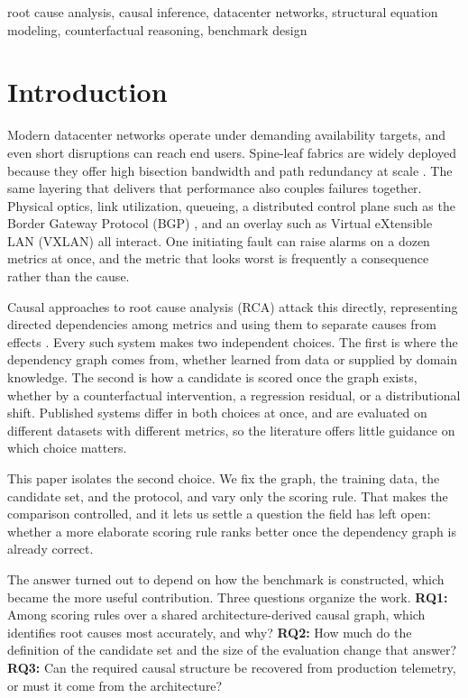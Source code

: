 \documentclass[conference]{IEEEtran}
\begin{document}
\begin{IEEEkeywords}
root cause analysis, causal inference, datacenter networks, structural equation modeling, counterfactual reasoning, benchmark design
\end{IEEEkeywords}

\section{Introduction}
Modern datacenter networks operate under demanding availability targets, and even short disruptions can reach end users. Spine-leaf fabrics are widely deployed because they offer high bisection bandwidth and path redundancy at scale \cite{alfares2008fattree,greenberg2009vl2}. The same layering that delivers that performance also couples failures together. Physical optics, link utilization, queueing, a distributed control plane such as the Border Gateway Protocol (BGP) \cite{rekhter2006bgp}, and an overlay such as Virtual eXtensible LAN (VXLAN) \cite{mahalingam2014vxlan} all interact. One initiating fault can raise alarms on a dozen metrics at once, and the metric that looks worst is frequently a consequence rather than the cause.

Causal approaches to root cause analysis (RCA) attack this directly, representing directed dependencies among metrics and using them to separate causes from effects \cite{pearl2009causality,peters2017elements}. Every such system makes two independent choices. The first is where the dependency graph comes from, whether learned from data or supplied by domain knowledge. The second is how a candidate is scored once the graph exists, whether by a counterfactual intervention, a regression residual, or a distributional shift. Published systems differ in both choices at once, and are evaluated on different datasets with different metrics, so the literature offers little guidance on which choice matters.

This paper isolates the second choice. We fix the graph, the training data, the candidate set, and the protocol, and vary only the scoring rule. That makes the comparison controlled, and it lets us settle a question the field has left open: whether a more elaborate scoring rule ranks better once the dependency graph is already correct.

The answer turned out to depend on how the benchmark is constructed, which became the more useful contribution. Three questions organize the work.
\label{sec:rqs}
\textbf{RQ1:} Among scoring rules over a shared architecture-derived causal graph, which identifies root causes most accurately, and why?
\textbf{RQ2:} How much do the definition of the candidate set and the size of the evaluation change that answer?
\textbf{RQ3:} Can the required causal structure be recovered from production telemetry, or must it come from the architecture?
\end{document}
